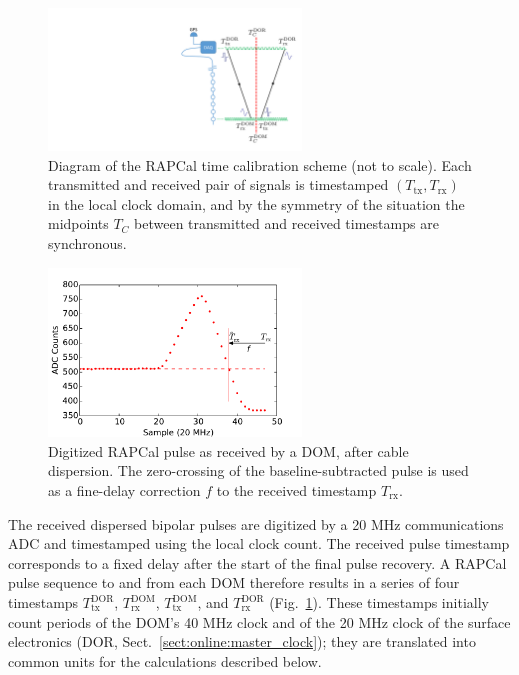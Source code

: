 \begin{figure}[!h]
 \centering
 \includegraphics[width=0.6\textwidth]{graphics/dom/rapcal/rapcal_symmetry.pdf}
 \caption{Diagram of the RAPCal time calibration scheme (not to scale).
   Each transmitted and received pair of signals is
   timestamped $(T_{\mathrm{tx}},T_{\mathrm{rx}})$ in the local clock domain, and by the symmetry of the
   situation the midpoints $T_C$ between transmitted and received timestamps are
   synchronous.} 
 \label{fig:rapcal_symmetry}
\end{figure}

\begin{figure}[h]
 \centering
 \includegraphics[width=0.6\textwidth]{graphics/dom/rapcal/dom_wf_zero_crossing.pdf}
 \caption{Digitized RAPCal pulse as received by a DOM, after cable dispersion.  The
   zero-crossing of the baseline-subtracted pulse is used as a fine-delay
   correction $f$ to the received timestamp $T_{\mathrm{rx}}$.}
 \label{fig:rapcal_zero_crossing}
\end{figure}

The received dispersed bipolar pulses are digitized by a 20 MHz communications ADC and 
timestamped using the local clock count.  The received pulse timestamp
corresponds to a fixed delay after the start of the final pulse recovery.  A RAPCal pulse sequence to and
from each DOM therefore results in a series of four timestamps 
$T_{\mathrm{tx}}^{\mathrm{DOR}}$, $T_{\mathrm{rx}}^{\mathrm{DOM}}$, 
$T_{\mathrm{tx}}^{\mathrm{DOM}}$,  and $T_{\mathrm{rx}}^{\mathrm{DOR}}$
(Fig.~\ref{fig:rapcal_symmetry}).  These timestamps initially count periods
of the DOM's 40 MHz clock and of the 20 MHz clock of the surface
electronics (DOR, Sect.~\ref{sect:online:master_clock}); they are
translated into common units for the calculations described below.

